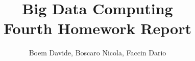 \documentclass[a4paper, 12pt]{article}
\begin{document}
	
\title{Big Data Computing \\ Fourth Homework Report}
\author{Boem Davide, Boscaro Nicola, Faccin Dario}
\date{}
\maketitle
\end{document}
